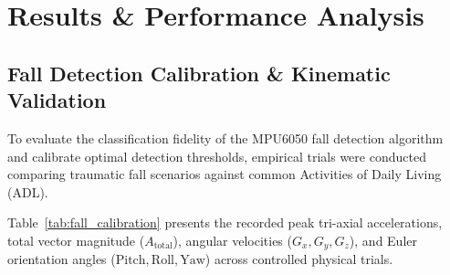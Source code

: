 \chapter{Results \& Performance Analysis}
\label{chap:results}

\section{Fall Detection Calibration \& Kinematic Validation}
To evaluate the classification fidelity of the MPU6050 fall detection algorithm and calibrate optimal detection thresholds, empirical trials were conducted comparing traumatic fall scenarios against common Activities of Daily Living (ADL). 

Table~\ref{tab:fall_calibration} presents the recorded peak tri-axial accelerations, total vector magnitude ($A_{\text{total}}$), angular velocities ($G_x, G_y, G_z$), and Euler orientation angles ($\text{Pitch}, \text{Roll}, \text{Yaw}$) across controlled physical trials.

